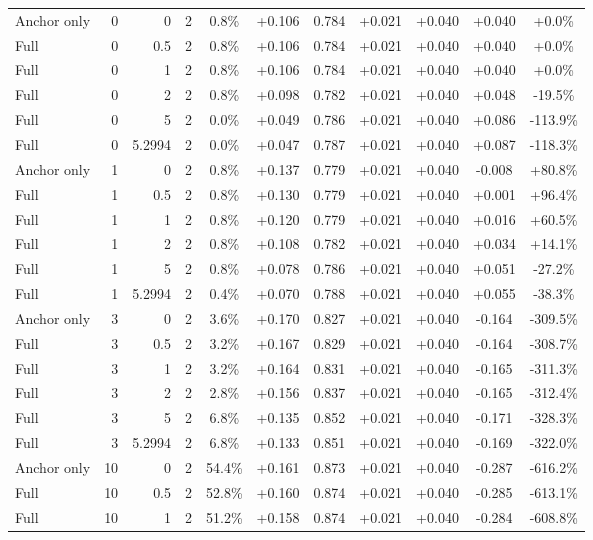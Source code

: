 \begin{table}[htbp]
\begin{tabular}{lrrrccccccc}
Anchor only & 0 & 0 & 2 & 0.8\% & +0.106 & 0.784 & +0.021 & +0.040 & +0.040 & +0.0\% \\
Full & 0 & 0.5 & 2 & 0.8\% & +0.106 & 0.784 & +0.021 & +0.040 & +0.040 & +0.0\% \\
Full & 0 & 1 & 2 & 0.8\% & +0.106 & 0.784 & +0.021 & +0.040 & +0.040 & +0.0\% \\
Full & 0 & 2 & 2 & 0.8\% & +0.098 & 0.782 & +0.021 & +0.040 & +0.048 & -19.5\% \\
Full & 0 & 5 & 2 & 0.0\% & +0.049 & 0.786 & +0.021 & +0.040 & +0.086 & -113.9\% \\
Full & 0 & 5.2994 & 2 & 0.0\% & +0.047 & 0.787 & +0.021 & +0.040 & +0.087 & -118.3\% \\
Anchor only & 1 & 0 & 2 & 0.8\% & +0.137 & 0.779 & +0.021 & +0.040 & -0.008 & +80.8\% \\
Full & 1 & 0.5 & 2 & 0.8\% & +0.130 & 0.779 & +0.021 & +0.040 & +0.001 & +96.4\% \\
Full & 1 & 1 & 2 & 0.8\% & +0.120 & 0.779 & +0.021 & +0.040 & +0.016 & +60.5\% \\
Full & 1 & 2 & 2 & 0.8\% & +0.108 & 0.782 & +0.021 & +0.040 & +0.034 & +14.1\% \\
Full & 1 & 5 & 2 & 0.8\% & +0.078 & 0.786 & +0.021 & +0.040 & +0.051 & -27.2\% \\
Full & 1 & 5.2994 & 2 & 0.4\% & +0.070 & 0.788 & +0.021 & +0.040 & +0.055 & -38.3\% \\
Anchor only & 3 & 0 & 2 & 3.6\% & +0.170 & 0.827 & +0.021 & +0.040 & -0.164 & -309.5\% \\
Full & 3 & 0.5 & 2 & 3.2\% & +0.167 & 0.829 & +0.021 & +0.040 & -0.164 & -308.7\% \\
Full & 3 & 1 & 2 & 3.2\% & +0.164 & 0.831 & +0.021 & +0.040 & -0.165 & -311.3\% \\
Full & 3 & 2 & 2 & 2.8\% & +0.156 & 0.837 & +0.021 & +0.040 & -0.165 & -312.4\% \\
Full & 3 & 5 & 2 & 6.8\% & +0.135 & 0.852 & +0.021 & +0.040 & -0.171 & -328.3\% \\
Full & 3 & 5.2994 & 2 & 6.8\% & +0.133 & 0.851 & +0.021 & +0.040 & -0.169 & -322.0\% \\
Anchor only & 10 & 0 & 2 & 54.4\% & +0.161 & 0.873 & +0.021 & +0.040 & -0.287 & -616.2\% \\
Full & 10 & 0.5 & 2 & 52.8\% & +0.160 & 0.874 & +0.021 & +0.040 & -0.285 & -613.1\% \\
Full & 10 & 1 & 2 & 51.2\% & +0.158 & 0.874 & +0.021 & +0.040 & -0.284 & -608.8\% \\

\end{tabular}
\end{table}
